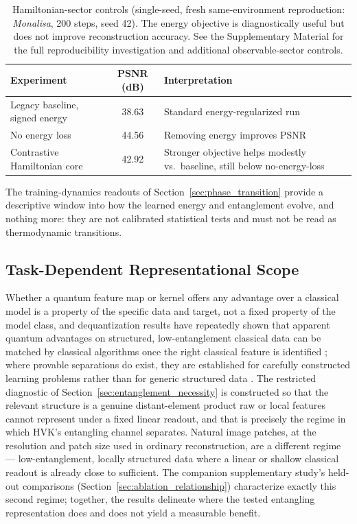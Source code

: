 \documentclass[journal]{IEEEtran}
\begin{document}
\begin{table}[t]
\centering
\caption{Hamiltonian-sector controls (single-seed, fresh same-environment reproduction: \textit{Monalisa}, 200 steps, seed 42). The energy objective is diagnostically useful but does not improve reconstruction accuracy. See the Supplementary Material for the full reproducibility investigation and additional observable-sector controls.}
\label{tab:hamiltonian_controls}
\scriptsize
\begin{tabular}{p{}cp{}}
\toprule
Experiment & PSNR (dB) & Interpretation \\
\midrule
Legacy baseline, signed energy & 38.63 & Standard energy-regularized run \\
No energy loss & 44.56 & Removing energy improves PSNR \\
Contrastive Hamiltonian core & 42.92 & Stronger objective helps modestly vs.\ baseline, still below no-energy-loss \\
\bottomrule
\end{tabular}
\end{table}

The training-dynamics readouts of Section~\ref{sec:phase_transition} provide a descriptive window into how the learned energy and entanglement evolve, and nothing more: they are not calibrated statistical tests and must not be read as thermodynamic transitions.

\subsection{Task-Dependent Representational Scope}
\label{sec:dequant}
Whether a quantum feature map or kernel offers any advantage over a classical model is a property of the specific data and target, not a fixed property of the model class, and dequantization results have repeatedly shown that apparent quantum advantages on structured, low-entanglement classical data can be matched by classical algorithms once the right classical feature is identified \cite{Huang2021PowerData, Tang2019}; where provable separations do exist, they are established for carefully constructed learning problems rather than for generic structured data \cite{Gyurik2023}. The restricted diagnostic of Section~\ref{sec:entanglement_necessity} is constructed so that the relevant structure is a genuine distant-element product raw or local features cannot represent under a fixed linear readout, and that is precisely the regime in which HVK's entangling channel separates. Natural image patches, at the resolution and patch size used in ordinary reconstruction, are a different regime --- low-entanglement, locally structured data where a linear or shallow classical readout is already close to sufficient. The companion supplementary study's held-out comparisons (Section~\ref{sec:ablation_relationship}) characterize exactly this second regime; together, the results delineate where the tested entangling representation does and does not yield a measurable benefit.
\end{document}
